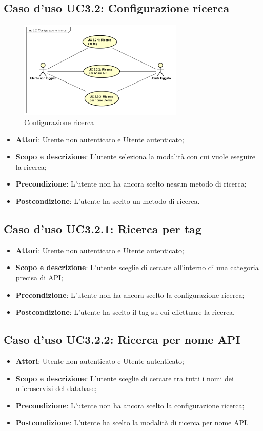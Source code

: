 \documentclass[12pt,a4paper,titlepage]{article}
\begin{document}
	\subsection{Caso d'uso UC3.2: Configurazione ricerca}
	\label{UC3.2}
	\begin{figure}[H]
		\centering
		\includegraphics[width=0.7\textwidth]{UseCase/ConfigurazioneRicerca}
		\caption{Configurazione ricerca}
	\end{figure}
	\begin{itemize}
		\item \textbf{Attori}: Utente non autenticato e Utente autenticato;
		\item \textbf{Scopo e descrizione}: L'utente seleziona la modalità con cui vuole eseguire la ricerca;
		\item \textbf{Precondizione}: L'utente non ha ancora scelto nessun metodo di ricerca;
		\item \textbf{Postcondizione}: L'utente ha scelto un metodo di ricerca.
	\end{itemize}
	\subsection{Caso d'uso UC3.2.1: Ricerca per tag}
	\label{UC3.2.1}
	\begin{itemize}
		\item \textbf{Attori}: Utente non autenticato e Utente autenticato;
		\item \textbf{Scopo e descrizione}: L'utente sceglie di cercare all'interno di una categoria precisa di API;
		\item \textbf{Precondizione}: L'utente non ha ancora scelto la configurazione ricerca;
		\item \textbf{Postcondizione}: L'utente ha scelto il tag su cui effettuare la ricerca.
	\end{itemize}
	\subsection{Caso d'uso UC3.2.2: Ricerca per nome API}
	\label{UC3.2.2}
	\begin{itemize}
		\item \textbf{Attori}: Utente non autenticato e Utente autenticato;
		\item \textbf{Scopo e descrizione}: L'utente sceglie di cercare tra tutti i nomi dei microservizi del database;
		\item \textbf{Precondizione}: L'utente non ha ancora scelto la configurazione ricerca;
		\item \textbf{Postcondizione}: L'utente ha scelto la modalità di ricerca per nome API.
	\end{itemize}
\end{document}
